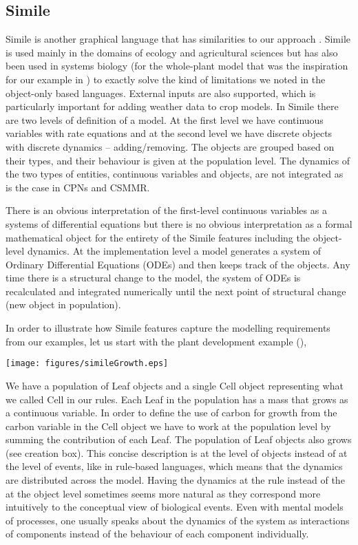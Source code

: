 \subsection{Simile}
\label{subsec:simile}
Simile is another graphical language that has similarities to our approach
\citep{muetzelfeldt_simile_2003}. Simile is used mainly in the domains of
ecology and agricultural sciences but has also been used in systems biology
(for the whole-plant model \citep{chew_multiscale_2014} that was
the inspiration for our example in ) to exactly solve the
kind of limitations we noted in the object-only based languages. External inputs
are also supported, which is particularly important for adding weather data to
crop models. In Simile there are two levels of definition of a model. At the
first level we have continuous variables with rate equations and at the second
level we have discrete objects with discrete dynamics -- adding/removing. The
objects are grouped based on their types, and their behaviour is given at the
population level. The dynamics of the two types of entities, continuous
variables and objects, are not integrated as is the case in CPNs and CSMMR.

There is an obvious interpretation of the first-level continuous variables as a
systems of differential equations but there is no obvious interpretation as a
formal mathematical object for the entirety of the Simile features including the
object-level dynamics. At the implementation level a model generates a system of
Ordinary Differential Equations (ODEs) and then keeps track of the objects. Any
time there is a structural change to the model, the system of ODEs is
recalculated and integrated numerically until the next point of structural
change (\eg new object in population).

In order to illustrate how Simile features capture the modelling requirements from our
examples, let us start with the plant development example (),
\begin{center}
  \texttt{[image: figures/simileGrowth.eps]}
\end{center}
We have a population of Leaf objects and a single Cell object representing what
we called $\mathrm{Cell}$ in our rules. Each Leaf in the population has a mass
that grows as a continuous variable. In order to define the use of carbon for
growth from the carbon variable in the Cell object we have to work at the
population level by summing the contribution of each Leaf. The population of
Leaf objects also grows (see creation box). This concise description is at the
level of objects instead of at the level of events, like in rule-based
languages, which means that the dynamics are distributed across the
model. Having the dynamics at the rule instead of the at the object level
sometimes seems more natural as they correspond more intuitively to the
conceptual view of biological events. Even with mental models of processes, one
usually speaks about the dynamics of the system as interactions of components
instead of the behaviour of each component individually.

